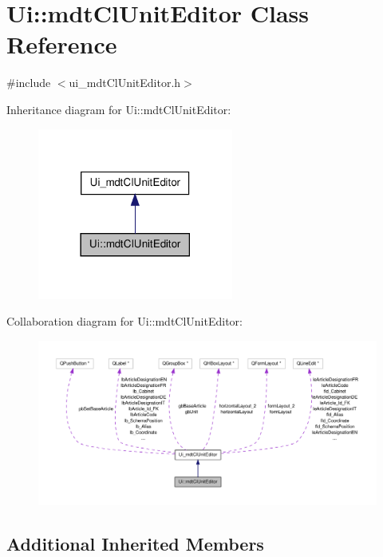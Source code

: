 \hypertarget{class_ui_1_1mdt_cl_unit_editor}{\section{Ui\-:\-:mdt\-Cl\-Unit\-Editor Class Reference}
\label{class_ui_1_1mdt_cl_unit_editor}
}


{\ttfamily \#include $<$ui\-\_\-mdt\-Cl\-Unit\-Editor.\-h$>$}



Inheritance diagram for Ui\-:\-:mdt\-Cl\-Unit\-Editor\-:\nopagebreak
\begin{figure}[H]
\begin{center}
\leavevmode
\includegraphics[width=182pt]{class_ui_1_1mdt_cl_unit_editor__inherit__graph}
\end{center}
\end{figure}


Collaboration diagram for Ui\-:\-:mdt\-Cl\-Unit\-Editor\-:\nopagebreak
\begin{figure}[H]
\begin{center}
\leavevmode
\includegraphics[width=350pt]{class_ui_1_1mdt_cl_unit_editor__coll__graph}
\end{center}
\end{figure}
\subsection*{Additional Inherited Members}


